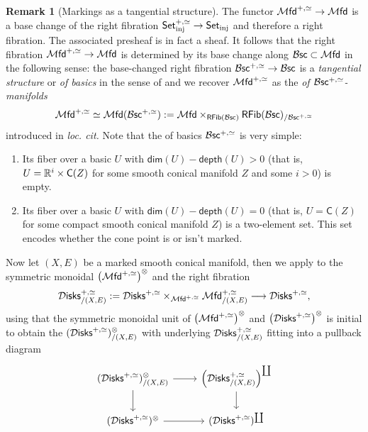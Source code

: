 \documentclass[10pt, reqno, twoside
, final
]{amsart}
\numberwithin{equation}{subsection}%
\theoremstyle{definition}
\theoremstyle{definition}
\theoremstyle{definition}
\theoremstyle{definition}
\theoremstyle{definition}
\theoremstyle{definition}
\theoremstyle{definition}
\theoremstyle{definition}
\theoremstyle{definition}
\theoremstyle{plain}
\theoremstyle{definition}
\theoremstyle{plain}
\theoremstyle{definition}
\theoremstyle{plain}
\theoremstyle{definition}
\newtheorem{rmk}[defn]{Remark}
\theoremstyle{definition}
\theoremstyle{plain}
\theoremstyle{plain}
\theoremstyle{definition}
\theoremstyle{plain}
\theoremstyle{plain}
\theoremstyle{plain}
\begin{document}
\begin{rmk}[Markings as a tangential structure]\label{rmk:markingstangentialstr}
The functor $\mathcal{M}\mathsf{fd}^{+,\simeq}\rightarrow \mathcal{M}\mathsf{fd}$ is a base change of the right fibration $\mathsf{Set}^{+,\simeq}_{\mathrm{inj}}\rightarrow \mathsf{Set}_{\mathrm{inj}}$ and therefore a right fibration. The associated presheaf is in fact a sheaf. It follows that the right fibration $\mathcal{M}\mathsf{fd}^{+,\simeq}\rightarrow \mathcal{M}\mathsf{fd}$ is determined by its base change along $\mathcal{B}\mathsf{sc}\subset\mathcal{M}\mathsf{fd}$ in the following sense: the base-changed right fibration $\mathcal{B}\mathsf{sc}^{+,\simeq}\rightarrow \mathcal{B}\mathsf{sc}$ is a \emph{tangential structure} or \emph{\infcat of basics} in the sense of \cite[Section 5]{AFT-local-structures} and we recover $\mathcal{M}\mathsf{fd}^{+,\simeq}$ as the \emph{\infcat of $\mathcal{B}\mathsf{sc}^{+,\simeq}$-manifolds} 
\[ \mathcal{M}\mathsf{fd}^{+,\simeq}\simeq \mathcal{M}\mathsf{fd}(\mathcal{B}\mathsf{sc}^{+,\simeq}):=\mathcal{M}\mathsf{fd}\times_{\mathsf{RFib}(\mathcal{B}\mathsf{sc})}\mathsf{RFib}(\mathcal{B}\mathsf{sc})_{/\mathcal{B}\mathsf{sc}^{+,\simeq}} \]
introduced in \emph{loc. cit.} Note that the \infcat of basics $\mathcal{B}\mathsf{sc}^{+,\simeq}$ is very simple:
\begin{enumerate}[$(1)$]
    \item Its fiber over a basic $U$ with $\mathsf{dim}(U)-\mathsf{depth}(U)>0$ (that is, $U=\mathbb{R}^i\times \mathsf{C}(Z)$ for some smooth conical manifold $Z$ and some $i>0$) is empty.
    \item Its fiber over a basic $U$ with $\mathsf{dim}(U)-\mathsf{depth}(U)=0$ (that is, $U=\mathsf{C}(Z)$ for some compact smooth conical manifold $Z$) is a two-element set. This set encodes whether the cone point is or isn't marked.
\end{enumerate}
\end{rmk}
Now let $(X,E)$ be a marked smooth conical manifold, then we apply \cite[Corollary 1.20, Notation 1.21]{AFT-fh-stratified} to the symmetric monoidal \infcat $\left(\mathcal{M}\mathsf{fd}^{+,\simeq}\right)^{\otimes}$ and the right fibration 
\[  \mathcal{D}\mathsf{isks}^{+,\simeq}_{/(X,E)} := \mathcal{D}\mathsf{isks}^{+,\simeq}\times_{\mathcal{M}\mathsf{fd}^{+,\simeq}}\mathcal{M}\mathsf{fd}^{+,\simeq}_{/(X,E)} \longrightarrow  \mathcal{D}\mathsf{isks}^{+,\simeq},   \]
using that the symmetric monoidal unit of $\left(\mathcal{M}\mathsf{fd}^{+,\simeq}\right)^{\otimes}$ and $\left(\mathcal{D}\mathsf{isks}^{+,\simeq}\right)^{\otimes}$ is initial to obtain the \infop $(\mathcal{D}\mathsf{isks}^{+,\simeq})^{\otimes}_{/(X,E)}$ with underlying \infcat $\mathcal{D}\mathsf{isks}^{+,\simeq}_{/(X,E)}$ fitting into a pullback diagram
\[
\begin{tikzcd}
     (\infdisks^{+,\simeq})^{\otimes}_{/(X,E)} \ar[d] \ar[r] & \left(\infdisks^{+,\simeq}_{/(X,E)}\right)^{\coprod} \ar[d] \\
     (\infdisks^{+,\simeq})^{\otimes} \ar[r] & (\infdisks^{+,\simeq})^{\coprod}
\end{tikzcd}
\]
\end{document}
